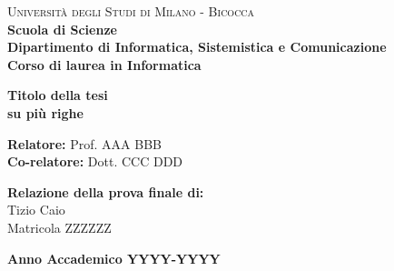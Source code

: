 \documentclass[a4paper,12pt]{report}
\begin{document}
    
    \begin{titlepage}
        
        \noindent
        \begin{minipage}[t]{0.18\textwidth}
        \end{minipage}
        \begin{minipage}[t]{0.82\textwidth}
        {
                {\textsc{Università degli Studi di Milano - Bicocca}} \\
                \textbf{Scuola di Scienze} \\
                \textbf{Dipartimento di Informatica, Sistemistica e Comunicazione} \\
                \textbf{Corso di laurea in Informatica} \\
                \par
        }
        \end{minipage}
        
	\vspace{40mm}
        
	\begin{center}
            {\LARGE{
                    \textbf{Titolo della tesi \\ su più righe}
                    \par
            }}
        \end{center}
        
        \vspace{50mm}

        \noindent
        {\large \textbf{Relatore:} Prof. AAA BBB } \\

        \noindent
        {\large \textbf{Co-relatore:} Dott. CCC DDD}
        
        \vspace{15mm}

        \begin{flushright}
            {\large \textbf{Relazione della prova finale di:}} \\
            \large{Tizio Caio} \\
            \large{Matricola ZZZZZZ} 
        \end{flushright}
        
        \vspace{40mm}
        \begin{center}
            {\large{\bf Anno Accademico YYYY-YYYY}}
        \end{center}

        \restoregeometry
        
    \end{titlepage}
    
\end{document}
